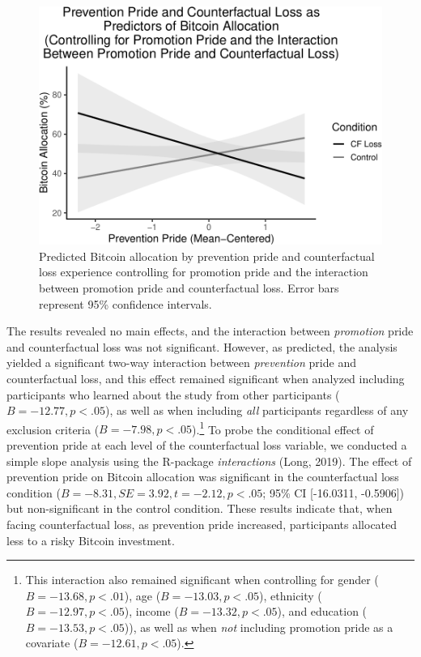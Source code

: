 \documentclass[man,floatsintext]{apa6}
\let\rmarkdownfootnote\footnote%
\def\footnote{\protect\rmarkdownfootnote}
\begin{document}
\begin{figure}

{\centering \includegraphics[width=0.9\linewidth,height=0.9\textheight]{rfcfloss_manuscript_files/figure-latex/primarymodelplot-1} 

}

\caption{Predicted Bitcoin allocation by prevention pride and counterfactual loss experience controlling for promotion pride and the interaction between promotion pride and counterfactual loss. Error bars represent 95\% confidence intervals.}\label{fig:primarymodelplot}
\end{figure}

The results revealed no main effects, and the interaction between \emph{promotion} pride and counterfactual loss was not significant. However, as predicted, the analysis yielded a significant two-way interaction between \emph{prevention} pride and counterfactual loss, and this effect remained significant when analyzed including participants who learned about the study from other participants (\(B=-12.77, p<.05\)), as well as when including \emph{all} participants regardless of any exclusion criteria (\(B=-7.98, p<.05\)).\footnote{This interaction also remained significant when controlling for gender (\(B=-13.68, p<.01\)), age (\(B=-13.03, p<.05\)), ethnicity (\(B=-12.97, p<.05\)), income (\(B=-13.32, p<.05\)), and education (\(B=-13.53, p<.05\))), as well as when \emph{not} including promotion pride as a covariate (\(B=-12.61, p<.05\)).} To probe the conditional effect of prevention pride at each level of the counterfactual loss variable, we conducted a simple slope analysis using the R-package \emph{interactions} (Long, 2019). The effect of prevention pride on Bitcoin allocation was significant in the counterfactual loss condition (\(B=-8.31, SE=3.92, t=-2.12, p<.05\); 95\% CI {[}-16.0311, -0.5906{]}) but non-significant in the control condition. These results indicate that, when facing counterfactual loss, as prevention pride increased, participants allocated less to a risky Bitcoin investment.
\end{document}
